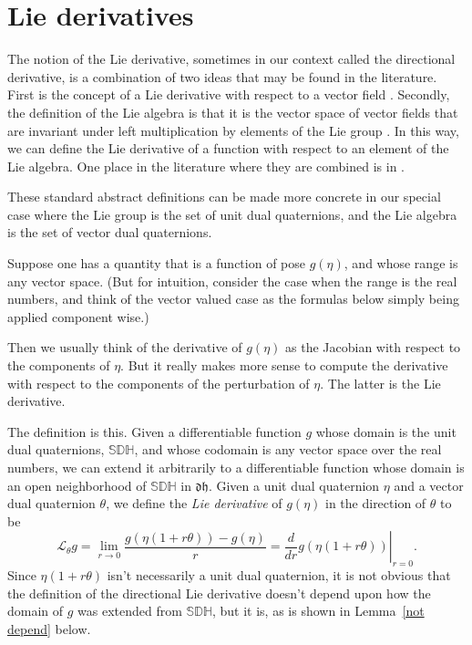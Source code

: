 \documentclass[reqno,12pt]{amsart}
\newcommand\setdualquat{\mathfrak d \mathfrak h}
\newcommand\setunitdualquat{\mathbb S\mathbb D\mathbb H}
\newcommand{\liederiv}{\mathcal L}
\begin{document}
\section{Lie derivatives}
\label{sec lie derivatives}

The notion of the Lie derivative, sometimes in our context called the directional derivative, is a combination of two ideas that may be found in the literature.  First is the concept of a Lie derivative with respect to a vector field \cite{yano}.  Secondly, the definition of the Lie algebra is that it is the vector space of vector fields that are invariant under left multiplication by elements of the Lie group \cite{lee}.  In this way, we can define the Lie derivative of a function with respect to an element of the Lie algebra.  One place in the literature where they are combined is in \cite[Equation~(5), Chapter~II]{helgason}.

These standard abstract definitions can be made more concrete in our special case where the Lie group is the set of unit dual quaternions, and the Lie algebra is the set of vector dual quaternions.

Suppose one has a quantity that is a function of pose $g(\eta)$, and whose range is any vector space.  (But for intuition, consider the case when the range is the real numbers, and think of the vector valued case as the formulas below simply being applied component wise.)

Then we usually think of the derivative of $g(\eta)$ as the Jacobian with respect to the components of $\eta$.  But it really makes more sense to compute the derivative with respect to the components of the perturbation of $\eta$.  The latter is the Lie derivative.

The definition is this.  Given a differentiable function $g$ whose domain is the unit dual quaternions, $\setunitdualquat$, and whose codomain is any vector space over the real numbers, we can extend it arbitrarily to a differentiable function whose domain is an open neighborhood of $\setunitdualquat$ in $\setdualquat$.  Given a unit dual quaternion $\eta$ and a vector dual quaternion $\theta$, we define the \emph{Lie derivative} of $g(\eta)$ in the direction of $\theta$ to be
\begin{equation}
\label{lie diff defn}
\liederiv_\theta g = 
\lim_{r\to 0} \frac{g(\eta(1+r \theta)) - g(\eta)} r = 
\left. \frac{d}{d r} g(\eta(1+r\theta)) \right |_{r = 0}.
\end{equation}
Since $\eta(1+r\theta)$ isn't necessarily a unit dual quaternion, it is not obvious that the definition of the directional Lie derivative doesn't depend upon how the domain of $g$ was extended from $\setunitdualquat$, but it is, as is shown in Lemma~\ref{not depend} below.
\end{document}
